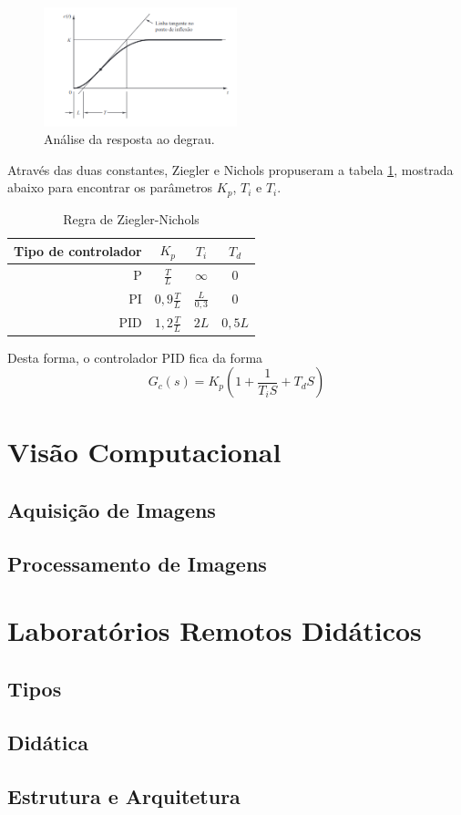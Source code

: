     \begin{figure}[ht]
        \centering
        \includegraphics[width=0.5\textwidth]{capitulos/curva_projeto_pid.png}
        \caption{Análise da resposta ao degrau.\cite{ogata2011engenharia}}
        \label{fig:curva_projeto_pid}
    \end{figure}\par
    Através das duas constantes, Ziegler e Nichols propuseram a tabela \ref{tab:tabela_ziegler_nichols}, mostrada abaixo para encontrar os parâmetros $K_{p}$, $T_{i}$ e $T_{i}$.
    \begin{table}[h!]
        \centering
        \begin{tabular}{| r | c | c | c |}
        \hline
            Tipo de controlador & $K_{p}$ & $T_{i}$ & $T_{d}$ \\
            \hline
            P & $\frac{T}{L}$ & $\infty$ & $0$ \\
            \hline
            PI & $0,9\frac{T}{L}$ & $\frac{L}{0,3}$ & $0$ \\
            \hline
            PID & $1,2\frac{T}{L}$ & $2L$ & $0,5L$ \\
        \hline
        \end{tabular}
        \caption{Regra de Ziegler-Nichols}
        \label{tab:tabela_ziegler_nichols}
    \end{table}
    \par
    Desta forma, o controlador PID fica da forma
    \begin{equation}
        G_{c}(s)= K_{p} (1 + \frac{1}{T_{i}S} + T_{d}S)
    \end{equation}
\section{Visão Computacional}
\subsection{Aquisição de Imagens}
\subsection{Processamento de Imagens}
\section{Laboratórios Remotos Didáticos}
\subsection{Tipos}
\subsection{Didática}
\subsection{Estrutura e Arquitetura}
